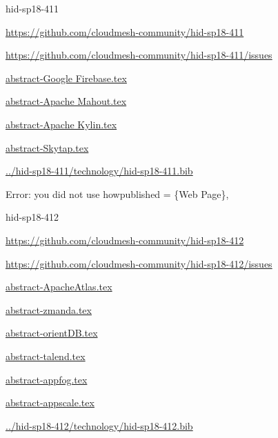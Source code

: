 \begin{IU}

hid-sp18-411

\url{https://github.com/cloudmesh-community/hid-sp18-411}

\url{https://github.com/cloudmesh-community/hid-sp18-411/issues}

\href{https://github.com/cloudmesh-community/hid-sp18-411/blob/master//technology/abstract-Google Firebase.tex}{abstract-Google Firebase.tex}

\href{https://github.com/cloudmesh-community/hid-sp18-411/blob/master//technology/abstract-Apache Mahout.tex}{abstract-Apache Mahout.tex}

\href{https://github.com/cloudmesh-community/hid-sp18-411/blob/master//technology/abstract-Apache Kylin.tex}{abstract-Apache Kylin.tex}

\href{https://github.com/cloudmesh-community/hid-sp18-411/blob/master//technology/abstract-Skytap.tex}{abstract-Skytap.tex}

\href{https://github.com/cloudmesh-community/hid-sp18-411/blob/master//technology/hid-sp18-411.bib}{../hid-sp18-411/technology/hid-sp18-411.bib}

Error: you did not use howpublished = \{Web Page\},

\end{IU}


\begin{IU}

hid-sp18-412

\url{https://github.com/cloudmesh-community/hid-sp18-412}

\url{https://github.com/cloudmesh-community/hid-sp18-412/issues}

\href{https://github.com/cloudmesh-community/hid-sp18-412/blob/master//technology/abstract-ApacheAtlas.tex}{abstract-ApacheAtlas.tex}

\href{https://github.com/cloudmesh-community/hid-sp18-412/blob/master//technology/abstract-zmanda.tex}{abstract-zmanda.tex}

\href{https://github.com/cloudmesh-community/hid-sp18-412/blob/master//technology/abstract-orientDB.tex}{abstract-orientDB.tex}

\href{https://github.com/cloudmesh-community/hid-sp18-412/blob/master//technology/abstract-talend.tex}{abstract-talend.tex}

\href{https://github.com/cloudmesh-community/hid-sp18-412/blob/master//technology/abstract-appfog.tex}{abstract-appfog.tex}

\href{https://github.com/cloudmesh-community/hid-sp18-412/blob/master//technology/abstract-appscale.tex}{abstract-appscale.tex}

\href{https://github.com/cloudmesh-community/hid-sp18-412/blob/master//technology/hid-sp18-412.bib}{../hid-sp18-412/technology/hid-sp18-412.bib}

\end{IU}


